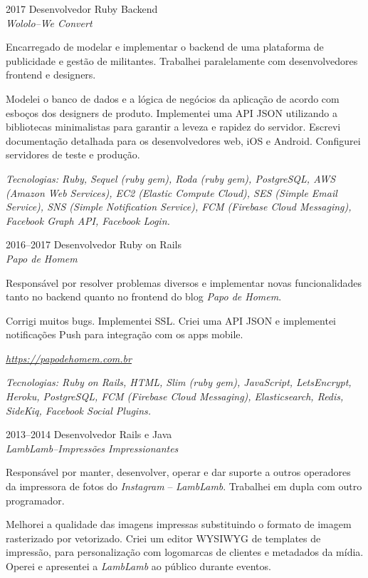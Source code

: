 \documentclass[a4paper]{simplecv}
\begin{document}
\begin{topic}
\item[2017] Desenvolvedor Ruby Backend\\
	{\em\small Wololo--We Convert}

	Encarregado de modelar e implementar o backend de uma plataforma de
	publicidade e gestão de militantes. Trabalhei paralelamente com
	desenvolvedores frontend e designers.

	Modelei o banco de dados e a lógica de negócios da aplicação de acordo
	com esboços dos designers de produto. Implementei uma API JSON
	utilizando a bibliotecas minimalistas para garantir a leveza e rapidez
	do servidor. Escrevi documentação detalhada para os desenvolvedores
	web, iOS e Android. Configurei servidores de teste e produção.

	{\em\scriptsize Tecnologias: Ruby, Sequel (ruby gem), Roda (ruby gem),
	PostgreSQL, AWS (Amazon Web Services), EC2 (Elastic Compute Cloud), SES
	(Simple Email Service), SNS (Simple Notification Service), FCM
	(Firebase Cloud Messaging), Facebook Graph API, Facebook Login.}

\item[2016--2017] Desenvolvedor Ruby on Rails\\
	{\em\small Papo de Homem}

	Responsável por resolver problemas diversos e implementar novas
	funcionalidades tanto no backend quanto no frontend do blog \emph{Papo
	de Homem}.

	Corrigi muitos bugs. Implementei SSL. Criei uma API JSON e implementei
	notificações Push para integração com os apps mobile.

	{\em\scriptsize \url{https://papodehomem.com.br}}

	{\em\scriptsize Tecnologias: Ruby on Rails, HTML, Slim (ruby gem),
	JavaScript, LetsEncrypt, Heroku, PostgreSQL, FCM (Firebase Cloud
	Messaging), Elasticsearch, Redis, SideKiq, Facebook Social Plugins.}

\item[2013--2014] Desenvolvedor Rails e Java\\
	{\em\small LambLamb--Impressões Impressionantes}

	Responsável por manter, desenvolver, operar e dar suporte a outros
	operadores da impressora de fotos do \emph{Instagram} --
	\emph{LambLamb}. Trabalhei em dupla com outro programador.

	Melhorei a qualidade das imagens impressas substituindo o formato de
	imagem rasterizado por vetorizado. Criei um editor WYSIWYG de templates
	de impressão, para personalização com logomarcas de clientes e
	metadados da mídia. Operei e apresentei a \emph{LambLamb} ao público
	durante eventos.


\end{topic}
\end{document}
